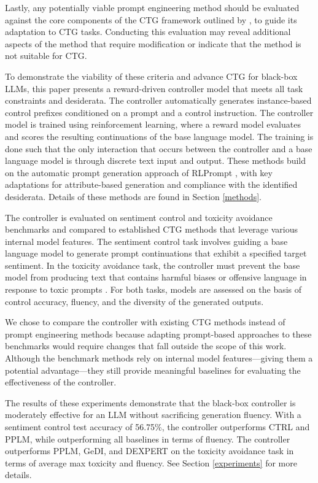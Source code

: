 \documentclass[phd,electronic,oneside,twosidetoc,letterpaper,chaptercenter,parttop,lof]{byumsphd}
\def\sentimentcontroltestaccuracy{56.75\%}
\begin{document}
Lastly, any potentially viable prompt engineering method should be evaluated against the core components of the CTG framework outlined by \citet{zhang2023survey}, to guide its adaptation to CTG tasks.
Conducting this evaluation may reveal additional aspects of the method that require modification or indicate that the method is not suitable for CTG.

To demonstrate the viability of these criteria and advance CTG for black-box LLMs, this paper presents a reward-driven controller model that meets all task constraints and desiderata.
The controller automatically generates instance-based control prefixes conditioned on a prompt and a control instruction.
The controller model is trained using reinforcement learning, where a reward model evaluates and scores the resulting continuations of the base language model.
The training is done such that the only interaction that occurs between the controller and a base language model is through discrete text input and output.
These methods build on the automatic prompt generation approach of RLPrompt \citep{deng-etal-2022-rlprompt}, with key adaptations for attribute-based generation and compliance with the identified desiderata.
Details of these methods are found in Section \ref{methods}.

The controller is evaluated on sentiment control and toxicity avoidance benchmarks and compared to established CTG methods that leverage various internal model features.
The sentiment control task involves guiding a base language model to generate prompt continuations that exhibit a specified target sentiment.
In the toxicity avoidance task, the controller must prevent the base model from producing text that contains harmful biases or offensive language in response to toxic prompts \citep{sheng2019bias, gehman2020toxicity}.
For both tasks, models are assessed on the basis of control accuracy, fluency, and the diversity of the generated outputs.

We chose to compare the controller with existing CTG methods instead of prompt engineering methods because adapting prompt-based approaches to these benchmarks would require changes that fall outside the scope of this work.
Although the benchmark methods rely on internal model features---giving them a potential advantage---they still provide meaningful baselines for evaluating the effectiveness of the controller.

The results of these experiments demonstrate that the black-box controller is moderately effective for an LLM without sacrificing generation fluency.
With a sentiment control test accuracy of \sentimentcontroltestaccuracy{}, the controller outperforms CTRL and PPLM, while outperforming all baselines in terms of fluency.
The controller outperforms PPLM, GeDI, and DEXPERT on the toxicity avoidance task in terms of average max toxicity and fluency.
See Section \ref{experiments} for more details.
\end{document}
